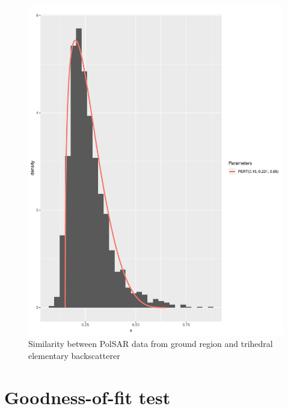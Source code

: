 \documentclass[conference]{IEEEtran}
\begin{document}
\begin{figure}[!ht]
    \centering
    \includegraphics[width = .9\linewidth, height = .7\linewidth]{../../../Figures/paper_19_05/tr_ground.pdf}
    \caption{Similarity between PolSAR data from ground region and trihedral elementary backscatterer}
    \label{fig:gr_tr}
\end{figure}

\section{Goodness-of-fit test}
\end{document}
